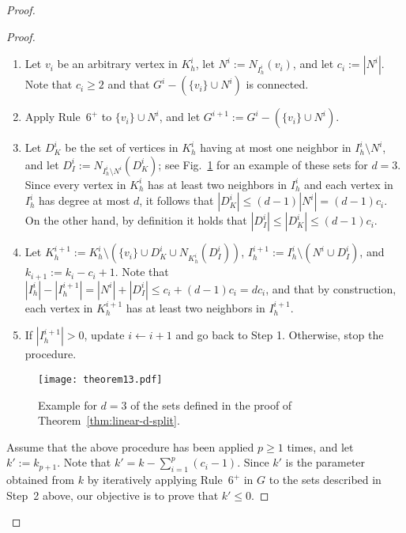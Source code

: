 \documentclass[
final
]{dmtcs-episciences}
\begin{document}
\begin{proof}
\begin{proof}
\begin{enumerate}
\item Let $v_i$ be an arbitrary vertex in $K^i_h$, let $N^i := N_{I_h^i}(v_i)$, and let $c_i := |N^i|$. Note that $c_i \geq 2$ and that  $G^i - (\{v_i\} \cup N^i)$ is connected.
\item Apply Rule~$6^+$ to $\{v_i\} \cup N^i$, and let $G^{i+1} := G^i - (\{v_i\} \cup N^i)$.
\item Let $D_K^i$ be the set of vertices in $K_h^i$ having at most one neighbor in $I_h^i \setminus N^i$, and let $D_I^i := N_{I_h^i  \setminus N^i} (D_K^i)$; see Fig.~\ref{fig-linear-kernel} for an example of these sets for $d=3$. Since every vertex in $K_h^i$ has at least two neighbors in $I_h^i$ and each vertex in $I_h^i$ has degree at most $d$, it follows that $|D_K^i| \leq (d-1)|N^i| = (d-1)c_i$. On the other hand, by definition it holds that $|D_I^i| \leq |D_K^i| \leq (d-1)c_i$.
\item Let $K_h^{i+1}:= K_h^{i} \setminus (\{v_i\} \cup D_K^i \cup N_{K_h^{i}}(D_I^i))$,  $I_h^{i+1}:= I_h^{i} \setminus (N^i \cup D_I^i )$, and $k_{i+1} := k_i - c_i +1$. Note that $ |I_h^{i}| - |I_h^{i+1}| = |N^i| + |D_I^i| \leq c_i + (d-1)c_i = dc_i$, and that by construction, each vertex in $K_h^{i+1}$ has at least two neighbors in $I_h^{i+1}$.
\item If $|I_h^{i+1}| > 0$, update $i \leftarrow i+1$ and go back to Step 1. Otherwise, stop the procedure.
\end{enumerate}

\begin{figure}[h]
\begin{center}\texttt{[image: theorem13.pdf]}\vspace{-.6cm}
\caption{Example for $d=3$ of the sets defined in the proof of Theorem~\ref{thm:linear-d-split}.} \label{fig-linear-kernel}
\end{center}
\end{figure}

Assume that the above procedure has been applied $p \geq 1$ times, and let $k' := k_{p+1}$. Note that $k' = k - \sum_{i=1}^p (c_i -1)$. Since $k'$ is the parameter obtained from $k$ by iteratively applying Rule~$6^+$ in $G$ to the sets described in Step~2 above, our objective is to prove that $k' \leq 0$.


\end{proof}
\end{proof}
\end{document}
